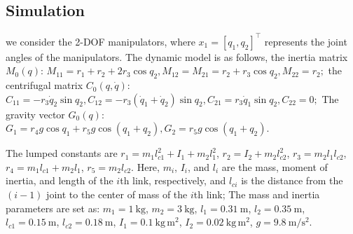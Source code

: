 \documentclass[pdflatex,sn-mathphys-num]{sn-jnl}%
\theoremstyle{thmstyleone}%
\theoremstyle{thmstyletwo}%
\theoremstyle{thmstylethree}%
\begin{document}
\subsection{Simulation}
\par we consider the 2-DOF manipulators, where $x_1 = [q_1, q_2]^{\top}$ represents the joint angles of the manipulators. The dynamic model is as follows, the inertia matrix $M_0(q)$:
$M_{11}=r_1+r_2+2r_3\cos q_2, M_{12}=M_{21}=r_2+r_3\cos q_2, M_{22}=r_2;$
the centrifugal matrix $C_0(q,\dot q)$:
$C_{11}=-r_3\dot q_2\sin q_2, C_{12}=-r_3(\dot q_1+\dot q_2)\sin q_2, C_{21}=r_3\dot q_1\sin q_2, C_{22}=0;$
The gravity vector $G_0(q)$:
$G_1=r_4 g\cos q_1+r_5 g\cos(q_1+q_2), G_2=r_5 g\cos(q_1+q_2).$



The lumped constants are \( r_1 = m_1 l_{c1}^2 + I_1 + m_2 l_1^2 \),
\( r_2 = I_2 + m_2 l_{c2}^2 \),
\( r_3 = m_2 l_1 l_{c2} \),
\( r_4 = m_1 l_{c1} + m_2 l_1 \),
\( r_5 = m_2 l_{c2} \).
Here, \(m_i\), \(I_i\), and \(l_i\) are the mass, moment of inertia, and length of the \(i\)th link, respectively, and \(l_{ci}\) is the distance from the $(i-1)$ joint to the center of mass of the \(i\)th link; The mass and inertia parameters are set as: \( m_1 = 1 \ \mathrm{kg} \), \( m_2 = 3 \ \mathrm{kg} \), \( l_1 = 0.31 \ \mathrm{m} \), \( l_2 = 0.35 \ \mathrm{m} \), \( l_{c1} = 0.15 \ \mathrm{m} \), \( l_{c2} = 0.18 \ \mathrm{m} \), \( I_1 = 0.1 \ \mathrm{kg \, m^2} \), \( I_2 = 0.02 \ \mathrm{kg \, m^2} \), \( g = 9.8 \ \mathrm{m/s^2} \).
\end{document}
